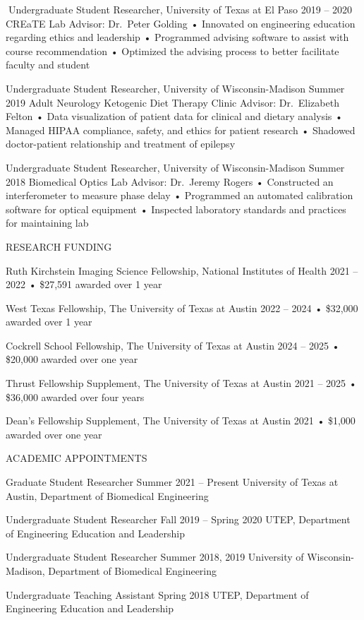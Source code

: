 \documentclass[
]{article}
\begin{document}
Undergraduate Student Researcher, University of Texas at El Paso 2019 --
2020 CREaTE Lab \textbar{} Advisor: Dr.~Peter Golding • Innovated on
engineering education regarding ethics and leadership • Programmed
advising software to assist with course recommendation • Optimized the
advising process to better facilitate faculty and student

Undergraduate Student Researcher, University of Wisconsin-Madison Summer
2019 Adult Neurology Ketogenic Diet Therapy Clinic \textbar{} Advisor:
Dr.~Elizabeth Felton • Data visualization of patient data for clinical
and dietary analysis • Managed HIPAA compliance, safety, and ethics for
patient research • Shadowed doctor-patient relationship and treatment of
epilepsy

Undergraduate Student Researcher, University of Wisconsin-Madison Summer
2018 Biomedical Optics Lab \textbar{} Advisor: Dr.~Jeremy Rogers •
Constructed an interferometer to measure phase delay • Programmed an
automated calibration software for optical equipment • Inspected
laboratory standards and practices for maintaining lab

RESEARCH FUNDING

Ruth Kirchstein Imaging Science Fellowship, National Institutes of
Health 2021 -- 2022 • \$27,591 awarded over 1 year

West Texas Fellowship, The University of Texas at Austin 2022 -- 2024 •
\$32,000 awarded over 1 year

Cockrell School Fellowship, The University of Texas at Austin 2024 --
2025 • \$20,000 awarded over one year

Thrust Fellowship Supplement, The University of Texas at Austin 2021 --
2025 • \$36,000 awarded over four years

Dean's Fellowship Supplement, The University of Texas at Austin 2021 •
\$1,000 awarded over one year

ACADEMIC APPOINTMENTS

Graduate Student Researcher Summer 2021 -- Present University of Texas
at Austin, Department of Biomedical Engineering

Undergraduate Student Researcher Fall 2019 -- Spring 2020 UTEP,
Department of Engineering Education and Leadership

Undergraduate Student Researcher Summer 2018, 2019 University of
Wisconsin-Madison, Department of Biomedical Engineering

Undergraduate Teaching Assistant Spring 2018 UTEP, Department of
Engineering Education and Leadership
\end{document}
